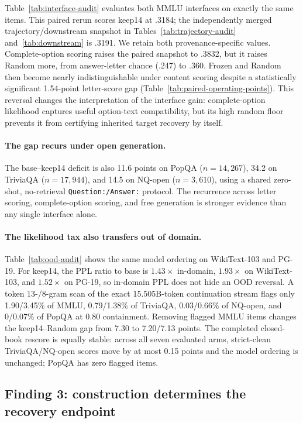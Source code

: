 Table~\ref{tab:interface-audit} evaluates both MMLU interfaces on exactly the
same items. This paired rerun scores keep14 at .3184; the independently merged
trajectory/downstream snapshot in Tables~\ref{tab:trajectory-audit}
and~\ref{tab:downstream} is .3191. We retain both provenance-specific values.
Complete-option scoring raises the paired snapshot to .3832, but it
raises Random more, from answer-letter chance (.247) to .360. Frozen and Random
then become nearly indistinguishable under content scoring despite a
statistically significant 1.54-point letter-score gap
(Table~\ref{tab:paired-operating-points}). This reversal changes the interpretation
of the interface gain: complete-option likelihood captures useful option-text
compatibility, but its high random floor prevents it from certifying inherited
target recovery by itself.

\paragraph{The gap recurs under open generation.}
The base--keep14 deficit is also 11.6 points on PopQA
($n{=}14{,}267$), 34.2 on TriviaQA ($n{=}17{,}944$), and 14.5 on NQ-open
($n{=}3{,}610$), using a shared zero-shot, no-retrieval
\texttt{Question:/Answer:} protocol. The recurrence across letter scoring,
complete-option scoring, and free generation is stronger evidence than any
single interface alone.



\paragraph{The likelihood tax also transfers out of domain.}
Table~\ref{tab:ood-audit} shows the same model ordering on WikiText-103 and
PG-19. For keep14, the PPL ratio to base is $1.43\times$ in-domain,
$1.93\times$ on WikiText-103, and $1.52\times$ on PG-19, so in-domain PPL does
not hide an OOD reversal. A token $13$-/$8$-gram scan of the exact 15.505B-token
continuation stream flags only 1.90/3.45\% of MMLU, 0.79/1.38\% of TriviaQA,
0.03/0.66\% of NQ-open, and 0/0.07\% of PopQA at 0.80 containment. Removing
flagged MMLU items changes the keep14--Random gap from 7.30 to 7.20/7.13 points.
The completed closed-book rescore is equally stable: across all seven evaluated
arms, strict-clean TriviaQA/NQ-open scores move by at most 0.15 points and the
model ordering is unchanged; PopQA has zero flagged items.

\subsection{Finding 3: construction determines the recovery endpoint}


